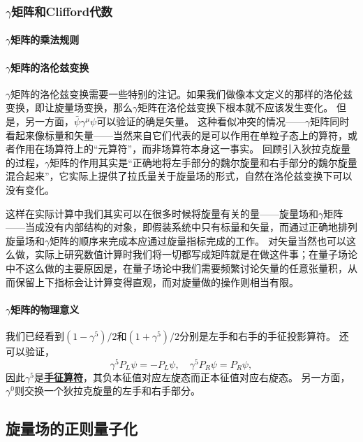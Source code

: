 \documentclass[hyperref, UTF8, a4paper]{ctexart}
\newcommand{\concept}[1]{\underline{\textbf{#1}}}
\begin{document}
\subsubsection{$\gamma$矩阵和Clifford代数}

\paragraph{$\gamma$矩阵的乘法规则}

\paragraph{$\gamma$矩阵的洛伦兹变换} %

$\gamma$矩阵的洛伦兹变换需要一些特别的注记。如果我们做像本文定义的那样的洛伦兹变换，即让旋量场变换，那么$\gamma$矩阵在洛伦兹变换下根本就不应该发生变化。
但是，另一方面，$\bar{\psi} \gamma^\mu \psi$可以验证的确是矢量。
这种看似冲突的情况——$\gamma$矩阵同时看起来像标量和矢量——当然来自它们代表的是可以作用在单粒子态上的算符，或者作用在场算符上的“元算符”，而非场算符本身这一事实。
回顾引入狄拉克旋量的过程，$\gamma$矩阵的作用其实是“正确地将左手部分的魏尔旋量和右手部分的魏尔旋量混合起来”，它实际上提供了拉氏量关于旋量场的形式，自然在洛伦兹变换下可以没有变化。

这样在实际计算中我们其实可以在很多时候将旋量有关的量——旋量场和$\gamma$矩阵——当成没有内部结构的对象，即假装系统中只有标量和矢量，而通过正确地排列旋量场和$\gamma$矩阵的顺序来完成本应通过旋量指标完成的工作。
对矢量当然也可以这么做，实际上研究数值计算时我们将一切都写成矩阵就是在做这件事；在量子场论中不这么做的主要原因是，在量子场论中我们需要频繁讨论矢量的任意张量积，从而保留上下指标会让计算变得直观，而对旋量做的操作则相当有限。

\paragraph{$\gamma$矩阵的物理意义} 我们已经看到$(1-\gamma^5)/2$和$(1+\gamma^5)/2$分别是左手和右手的手征投影算符。
还可以验证，
\begin{equation}
    \gamma^5 P_L \psi = - P_L \psi, \quad \gamma^5 P_R \psi = P_R \psi,
\end{equation}
因此$\gamma^5$是\concept{手征算符}，其负本征值对应左旋态而正本征值对应右旋态。
另一方面，$\gamma^0$则交换一个狄拉克旋量的左手和右手部分。

\subsection{旋量场的正则量子化}
\end{document}
